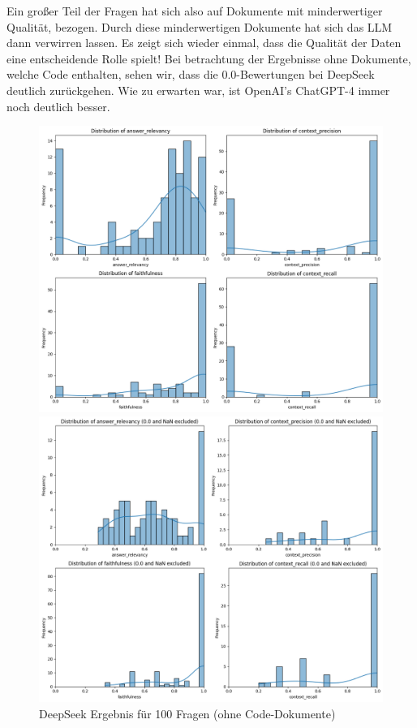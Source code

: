 Ein großer Teil der Fragen hat sich also auf Dokumente mit minderwertiger Qualität, bezogen. Durch diese minderwertigen Dokumente hat sich das LLM dann verwirren lassen.
Es zeigt sich wieder einmal, dass die Qualität der Daten eine entscheidende Rolle spielt!
Bei betrachtung der Ergebnisse ohne Dokumente, welche Code enthalten, sehen wir, dass die 0.0-Bewertungen bei DeepSeek deutlich zurückgehen. Wie zu erwarten war, ist OpenAI's ChatGPT-4 immer noch deutlich besser.

\begin{figure}[htbp]
    \centering
    \begin{minipage}[b]{0.48\textwidth}
        \centering
        \includegraphics[width=\textwidth]{images/20_4_D_D_distribution.png}
        \caption{DeepSeek Ergebnis für 100 Fragen (ohne Code-Dokumente)}
        \label{fig:deepseek_no_code}
    \end{minipage}
    \hfill
    \begin{minipage}[b]{0.48\textwidth}
        \centering
        \includegraphics[width=\textwidth]{images/127_38_O_O_distribution.png}

\end{minipage}
\end{figure}
